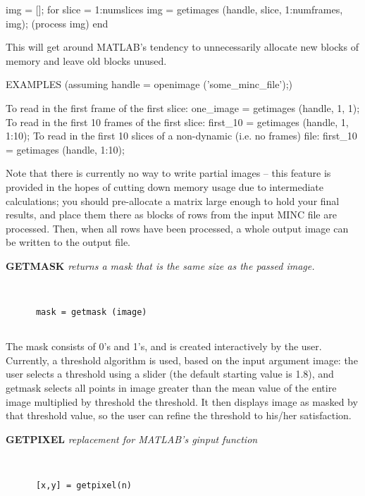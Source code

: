    img = [];
   for slice = 1:numslices
      img = getimages (handle, slice, 1:numframes, img);
      (process img)
   end
 
   This will get around MATLAB's tendency to unnecessarily allocate
   new blocks of memory and leave old blocks unused.
 
   EXAMPLES (assuming handle = openimage ('some\_minc\_file');)
 
    To read in the first frame of the first slice:
      one\_image = getimages (handle, 1, 1);
    To read in the first 10 frames of the first slice:
      first\_10 = getimages (handle, 1, 1:10);
    To read in the first 10 slices of a non-dynamic (i.e. no frames) file:
      first\_10 = getimages (handle, 1:10);
    
   Note that there is currently no way to write partial images -- this 
   feature is provided in the hopes of cutting down memory usage due
   to intermediate calculations; you should pre-allocate a matrix large
   enough to hold your final results, and place them there as blocks of 
   rows from the input MINC file are processed.  Then, when all rows
   have been processed, a whole output image can be written to the
   output file.
\endfunchelp



{\large\bf GETMASK} {\em returns a mask that is the same size as the passed image.}
\begin{verbatim}


      mask = getmask (image)


\end{verbatim}

  The mask consists of 0's and 1's, and is created interactively by
  the user.  Currently, a threshold algorithm is used, based on the input
  argument image: the user selects a threshold using a slider (the default
  starting value is 1.8), and getmask selects all points in image greater
  than the mean value of the entire image multiplied by threshold the
  threshold.  It then displays image as masked by that threshold value, so
  the user can refine the threshold to his/her satisfaction.
\endfunchelp


{\large\bf GETPIXEL} {\em replacement for MATLAB's ginput function}
\begin{verbatim}


      [x,y] = getpixel(n)


\end{verbatim}

